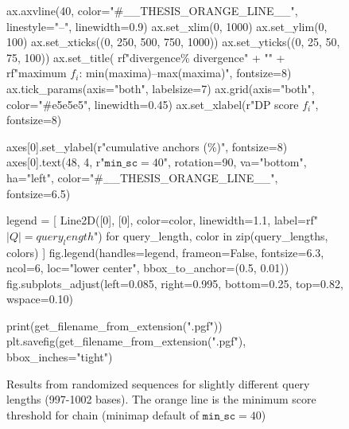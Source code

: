 \begin{figure}[H]
\begin{CacheMeCode}
    ax.axvline(40, color="#__THESIS_ORANGE_LINE__", linestyle="--", linewidth=0.9)
    ax.set_xlim(0, 1000)
    ax.set_ylim(0, 100)
    ax.set_xticks((0, 250, 500, 750, 1000))
    ax.set_yticks((0, 25, 50, 75, 100))
    ax.set_title(
        rf"{divergence}\% divergence" + "\n" +
        rf"maximum $f_i$: {min(maxima)}--{max(maxima)}",
        fontsize=8)
    ax.tick_params(axis="both", labelsize=7)
    ax.grid(axis="both", color="#e5e5e5", linewidth=0.45)
    ax.set_xlabel(r"DP score $f_i$", fontsize=8)

axes[0].set_ylabel(r"cumulative anchors (\%)", fontsize=8)
axes[0].text(48, 4, r"$\mathtt{min\_sc}=40$", rotation=90,
             va="bottom", ha="left", color="#__THESIS_ORANGE_LINE__", fontsize=6.5)

legend = [
    Line2D([0], [0], color=color, linewidth=1.1,
           label=rf"$|Q|={query_length}$")
    for query_length, color in zip(query_lengths, colors)
]
fig.legend(handles=legend, frameon=False, fontsize=6.3, ncol=6,
           loc="lower center", bbox_to_anchor=(0.5, 0.01))
fig.subplots_adjust(left=0.085, right=0.995, bottom=0.25, top=0.82, wspace=0.10)

print(get_filename_from_extension(".pgf"))
plt.savefig(get_filename_from_extension(".pgf"), bbox_inches="tight")
\end{CacheMeCode}
\caption{Results from randomized sequences for slightly different query lengths (997-1002 bases). The orange line is the minimum score threshold for chain (minimap default of \(\texttt{min\_sc}=40\))}
\label{fig:chaining-max-drop-score-counts}
\end{figure}

